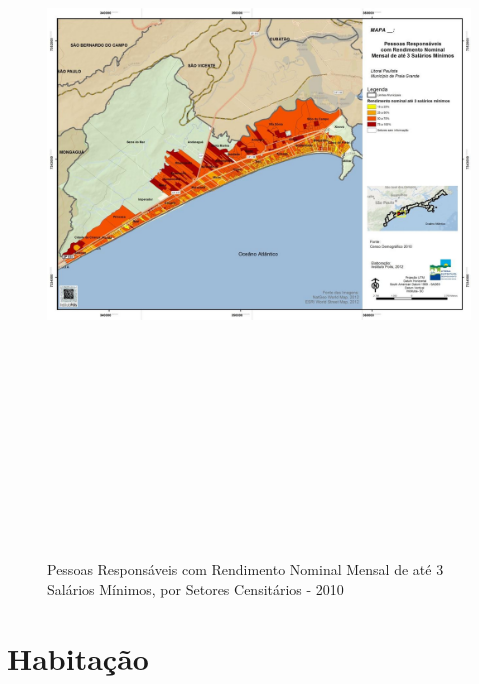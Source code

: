 	\begin{landscape}
		\begin{figure}[h]
			\centering
			\caption{Pessoas Responsáveis com Rendimento Nominal Mensal de até 3 Salários Mínimos, por Setores Censitários - 2010}
			\includegraphics[width=20cm,height=20cm,keepaspectratio]{img/polis_3sm.png}
			\label{mapa_3sm}
		\end{figure}
	\end{landscape}

	\section{Habitação}
	
	
